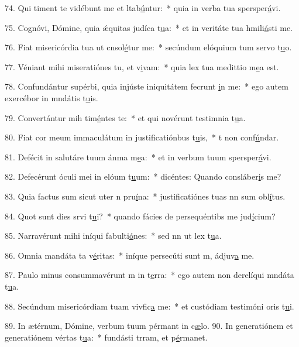 74. Qui timent te vidébunt me et ltab\uline{ú}ntur:~* quia in verba tua spersper\uline{á}vi.\par 
75. Cognóvi, Dómine, quia ǽquitas judíca t\uline{u}a:~* et in veritáte tua hmili\uline{á}sti me.\par 
76. Fiat misericórdia tua ut cnsol\uline{é}tur me:~* secúndum elóquium tum servo t\uline{u}o.\par 
77. Véniant mihi miseratiónes tu, et v\uline{i}vam:~* quia lex tua medittio m\uline{e}a est.\par 
78. Confundántur supérbi, quia injúste iniquitátem fecrunt \uline{i}n me:~* ego autem exercébor in mndátis t\uline{u}is.\par 
79. Convertántur mih tim\uline{é}ntes te:~* et qui novérunt testimnia t\uline{u}a.\par 
80. Fiat cor meum immaculátum in justificatiónbus t\uline{u}is,~* t non conf\uline{ú}ndar.\par 
81. Defécit in salutáre tuum ánma m\uline{e}a:~* et in verbum tuum spersper\uline{á}vi.\par 
82. Defecérunt óculi mei in elóum t\uline{u}um:~* dicéntes: Quando consláber\uline{i}s me?\par 
83. Quia factus sum sicut uter n pru\uline{í}na:~* justificatiónes tuas nn sum obl\uline{í}tus.\par 
84. Quot sunt dies srvi t\uline{u}i?~* quando fácies de persequéntibs me jud\uline{í}cium?\par 
85. Narravérunt mihi iníqui fabulti\uline{ó}nes:~* sed nn ut lex t\uline{u}a.\par 
86. Omnia mandáta ta v\uline{é}ritas:~* iníque persecúti sunt m, ádjuv\uline{a} me.\par 
87. Paulo minus consummavérunt m in t\uline{e}rra:~* ego autem non derelíqui mndáta t\uline{u}a.\par 
88. Secúndum misericórdiam tuam vivfic\uline{a} me:~* et custódiam testimóni oris t\uline{u}i.\par 
89. In ætérnum, Dómine, verbum tuum pérmant in c\uline{æ}lo.
90. In generatiónem et generatiónem vértas t\uline{u}a:~* fundásti trram, et p\uline{é}rmanet.\par 
